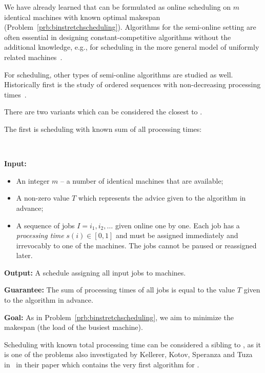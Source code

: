 We have already learned that \binstretch can be formulated as online
scheduling on $m$ identical machines with known optimal makespan
(Problem~\ref{prb:binstretchscheduling}). Algorithms for the
semi-online setting are often essential in designing
constant-competitive algorithms without the additional knowledge,
e.g., for scheduling in the more general model of uniformly related
machines~\cite{AsAFPW97,BeChKa00,EbJaSg09}.

For scheduling, other types of semi-online algorithms are
studied as well. Historically first is the study of ordered sequences with
non-decreasing processing times~\cite{Graham69}.

There are two variants which can be considered the closest to \binstretch.

The first is scheduling with known sum of all processing times:

\begin{prb}[\schedulingtptshort]~
\label{prb:schedulingtpt}

\smallskip

\noindent\textbf{Input:}

\begin{itemize}
\item An integer $m$ -- a number of identical machines that are available;
\item A non-zero value $T$ which represents the advice given to the algorithm in advance;
\item A sequence of jobs $I=i_1, i_2, \ldots$ given online one by one. Each job has
a \textit{processing time} $s(i) \in [0,1]$ and must be assigned immediately and irrevocably
to one of the machines. The jobs cannot be paused or reassigned later.
\end{itemize}

\noindent\textbf{Output:} A schedule assigning all input jobs to machines.

\noindent\textbf{Guarantee:} The sum of processing times of all jobs is equal to the value
$T$ given to the algorithm in advance.

\noindent\textbf{Goal:} As in Problem~\ref{prb:binstretchscheduling}, we aim to minimize the
makespan (the load of the busiest machine).

\noindent
\smallskip
\end{prb}

Scheduling with known total processing time can be considered a
sibling to \binstretch, as it is one of the problems also investigated
by Kellerer, Kotov, Speranza and Tuza in~\cite{KeKoST97} in their
paper which contains the very first algorithm for \binstretch.

